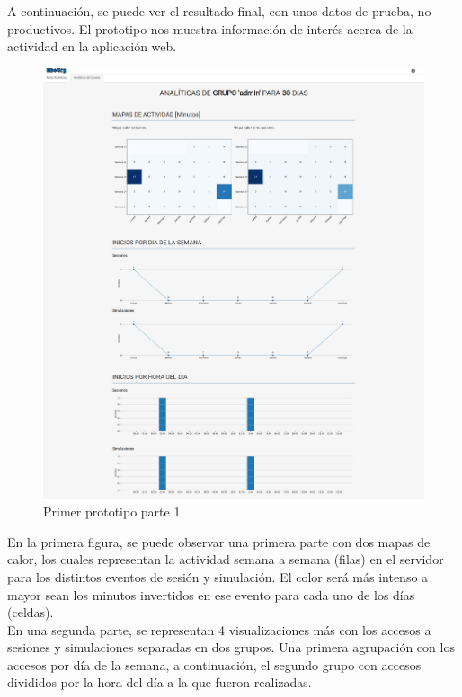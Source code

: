 \documentclass[11pt,a4paper]{book}
\begin{document}
			A continuación, se puede ver el resultado final, con unos datos de prueba, no productivos. El prototipo nos muestra información de interés acerca de la actividad en la aplicación web.\\
			
			\begin{figure}[H]
				\centering
				\includegraphics[width=14cm, keepaspectratio]{img/primer_prototipo_1.png}
				\caption{Primer prototipo parte 1.}
				\label{fig:primer_prototipo_1}
			\end{figure}
		
			En la primera figura, se puede observar una primera parte con dos mapas de calor, los cuales representan la actividad semana a semana (filas) en el servidor para los distintos eventos de sesión y simulación. El color será más intenso a mayor sean los minutos invertidos en ese evento para cada uno de los días (celdas).\\
			
			En una segunda parte, se representan 4 visualizaciones más con los accesos a sesiones y simulaciones separadas en dos grupos. Una primera agrupación con los accesos por día de la semana, a continuación, el segundo grupo con accesos divididos por la hora del día a la que fueron realizadas.\\
			
\end{document}
